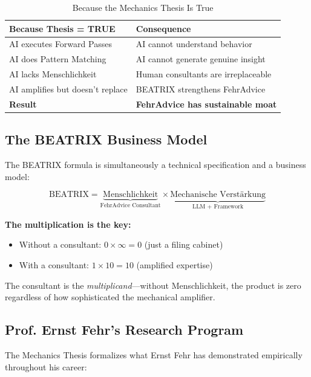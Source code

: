 \begin{table}[htbp]
\centering
\caption{Because the Mechanics Thesis Is True}
\renewcommand{\arraystretch}{1.4}
\begin{tabular}{@{}p{5.5cm}p{6.5cm}@{}}
\toprule
\textbf{Because Thesis = TRUE} & \textbf{Consequence} \\
\midrule
AI executes Forward Passes & AI cannot understand behavior \\
AI does Pattern Matching & AI cannot generate genuine insight \\
AI lacks Menschlichkeit & Human consultants are irreplaceable \\
AI amplifies but doesn't replace & BEATRIX strengthens FehrAdvice \\
\midrule
\textbf{Result} & \textbf{FehrAdvice has sustainable moat} \\
\bottomrule
\end{tabular}
\end{table}

\subsection{The BEATRIX Business Model}

The BEATRIX formula is simultaneously a technical specification and a business model:

\begin{equation}
\text{BEATRIX} = \underbrace{\text{Menschlichkeit}}_{\text{FehrAdvice Consultant}} \times \underbrace{\text{Mechanische Verstärkung}}_{\text{LLM + Framework}}
\end{equation}

\textbf{The multiplication is the key:}
\begin{itemize}[nosep]
    \item Without a consultant: $0 \times \infty = 0$ (just a filing cabinet)
    \item With a consultant: $1 \times 10 = 10$ (amplified expertise)
\end{itemize}

The consultant is the \textit{multiplicand}---without Menschlichkeit, the product is zero regardless of how sophisticated the mechanical amplifier.

\subsection{Prof. Ernst Fehr's Research Program}

The Mechanics Thesis formalizes what Ernst Fehr has demonstrated empirically throughout his career:

